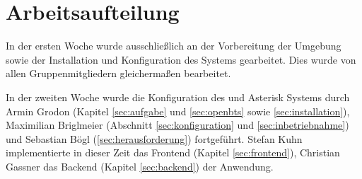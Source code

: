 \section{Arbeitsaufteilung}
In der ersten Woche wurde ausschließlich an der Vorbereitung der Umgebung sowie der Installation und Konfiguration des \OpenBTS Systems gearbeitet. Dies wurde von allen Gruppenmitgliedern gleichermaßen bearbeitet.

In der zweiten Woche wurde die Konfiguration des \OpenBTS und Asterisk Systems durch Armin Grodon (Kapitel \ref{sec:aufgabe} und \ref{sec:openbts} sowie \autoref{sec:installation}), 
Maximilian Briglmeier (Abschnitt \ref{sec:konfiguration} und \ref{sec:inbetriebnahme})
und Sebastian Bögl (\autoref{sec:herausforderung}) fortgeführt. 
Stefan Kuhn implementierte in dieser Zeit das Frontend (Kapitel \ref{sec:frontend}), 
Christian Gassner das Backend (Kapitel \ref{sec:backend}) der Anwendung.